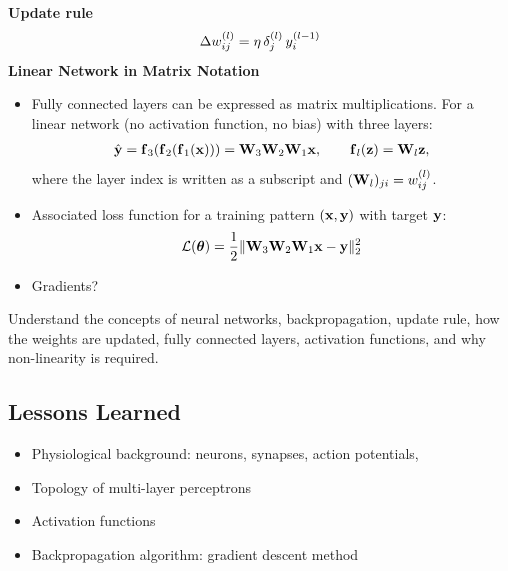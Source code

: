   \textbf{Update rule}
  \begin{displaymath}
    \Delta w_{ij}^{(l)} = \eta \, \delta_j^{(l)} \, y_{i}^{(l-1)}
  \end{displaymath}
\textbf{Linear Network in Matrix Notation}
	\begin{itemize}
		\item Fully connected layers can be expressed as matrix multiplications. For a linear network (no activation function, no bias) with three layers:
		\begin{align*}
		\hat{\bm{\mathrm{y}}}= \bm{\mathrm{f}}_{3}(\bm{\mathrm{f}}_{2}(\bm{\mathrm{f}}_{1}(\bm{\mathrm{x}}))) = \mathbf{W}_3 \mathbf{W}_2 \mathbf{W}_1\bm{\mathrm{x}}, \qquad \bm{\mathrm{f}}_l(\bm{\mathrm{z}}) = \mathbf{W}_l\bm{\mathrm{z}},
		\end{align*}
		{\small where the layer index is written as a subscript and $(\mathbf{W}_l)_{ji} = w_{ij}^{(l)}$.}
		\item Associated loss function for a training pattern $(\bm{\mathrm{x}},\bm{\mathrm{y}})$ with target $\bm{\mathrm{y}}$:
			\begin{align*}
			\mathcal{L}(\bm{\mathrm{\theta}})= \frac{1}{2} \| \mathbf{W}_3 \mathbf{W}_2  \mathbf{W}_1 \bm{\mathrm{x}} - \bm{\mathrm{y}} \|_2^2
			\end{align*}
		\item Gradients?
	\end{itemize}
Understand the concepts of neural networks, backpropagation, update rule, how the weights are updated, fully connected layers, activation functions, and why non-linearity is required.
  
\subsection{Lessons Learned}
  \begin{itemize}  
    \item Physiological background: neurons, synapses, action potentials, 
    \item Topology of multi-layer perceptrons
    \item Activation functions 
    \item Backpropagation algorithm: gradient descent method
  \end{itemize}
  
